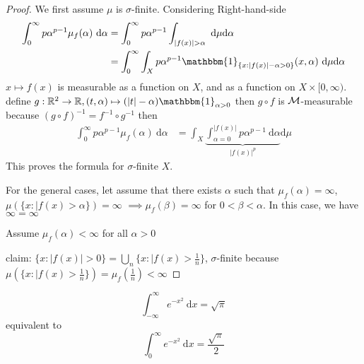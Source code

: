\begin{proof}
  We first assume $\mu$ is $\sigma$-finite.
  Considering Right-hand-side 
  \begin{align*}
    \int_0^\infty p\alpha^{p-1} \mu_f(\alpha) \ \mathrm{d}\alpha &= \int_0^\infty p\alpha^{p-1}\int_{|f(x)| > \alpha} \ \mathrm{d}\mu \mathrm{d}\alpha\\
    &= \int_0^\infty \int_X p\alpha^{p-1} \mathbbm{1}_{\{x : |f(x)| - \alpha > 0\}} (x, \alpha) \ \mathrm{d}\mu \mathrm{d}\alpha
  \end{align*}
  $x \mapsto f(x)$ is measurable as a function on $X$, and as a function on $X\times [0, \infty)$. 
  define $g: \RR^2 \to \RR, (t, \alpha) \mapsto (|t| - \alpha)\mathbbm{1}_{\alpha > 0}$ then $g \circ f$ is $\mathcal M$-measurable 
  because $(g \circ f)^{-1} = f^{-1} \circ g^{-1}$ then
  \begin{align*}
    \int_0^\infty p\alpha^{p-1} \mu_f(\alpha) \ \mathrm{d}\alpha &= \int_X \underbrace{\int_{\alpha=0}^{|f(x)|} p\alpha^{p-1} \ \mathrm{d}\alpha}_{|f(x)|^p}\mathrm{d}\mu  
  \end{align*}
  This proves the formula for $\sigma$-finite $X$.

  For the general cases, let assume that there exists $\alpha$ such that $\mu_f(\alpha) = \infty$,
  $\mu(\{x : |f(x) > \alpha\}) = \infty$ $\implies \mu_f(\beta) = \infty$ for $0 < \beta < \alpha$.
  In this case, we have $\infty = \infty$

  Assume $\mu_f(\alpha) < \infty$ for all $\alpha > 0$

  claim: $\{x : |f(x)| > 0\} = \bigcup_{n} \{x : |f(x) > \frac1n \}$, $\sigma$-finite because 
  $ \mu(\{x : |f(x) > \frac1n \}) = \mu_f(\frac{1}n)< \infty$
\end{proof}

\begin{example}
  \[\int_{-\infty}^\infty e^{-x^2} \ \mathrm{d}x = \sqrt\pi\]
  equivalent to
  \[\int_{0}^\infty e^{-x^2} \ \mathrm{d}x = \frac{\sqrt\pi}2\]
 

\end{example}

